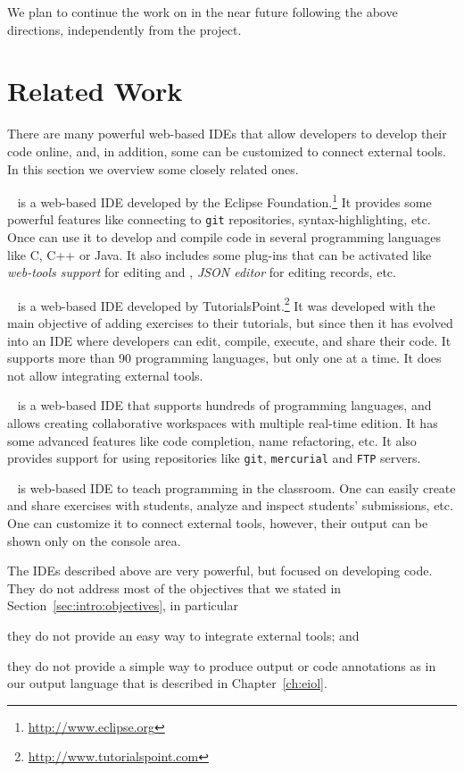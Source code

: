 \noindent
We plan to continue the work on \ei in the near future following the
above directions, independently from the \envisage project.

\section{Related Work}

There are many powerful web-based IDEs that allow developers to
develop their code online, and, in addition, some can be customized to
connect external tools. In this section we overview some closely
related ones.

~\cite{orion} is a web-based IDE developed by the Eclipse
Foundation.\footnote{\url{http://www.eclipse.org}}
%
It provides some powerful features like connecting to \texttt{git}
repositories, syntax-highlighting, etc. Once can use it to develop and
compile code in several programming languages like C, C++ or Java.
%
It also includes some plug-ins that can be activated like
\emph{web-tools support} for editing  and ,
\emph{JSON editor} for editing  records, etc.

~\cite{codingground} is a web-based IDE developed
by TutorialsPoint.\footnote{\url{http://www.tutorialspoint.com}}
%
It was developed with the main objective of adding exercises to their
tutorials, but since then it has evolved into an IDE where developers
can edit, compile, execute, and share their code.
%
It supports more than 90 programming languages, but only one at a
time. It does not allow integrating external tools.

~\cite{cloud9} is a web-based IDE that supports hundreds
of programming languages, and allows creating collaborative workspaces
with multiple real-time edition.
%
It has some advanced features like code completion, name refactoring,
etc. It also provides support for using repositories like
\texttt{git}, \texttt{mercurial} and \texttt{FTP} servers.
%

%
~\cite{codeboard} is web-based IDE to teach programming
in the classroom. One can easily create and share exercises with
students, analyze and inspect students' submissions, etc. One can
customize it to connect external tools, however, their output can be
shown only on the console area.


The IDEs described above are very powerful, but focused on developing
code. They do not address most of the objectives that we stated in
Section~\ref{sec:intro:objectives}, in particular
%
\begin{inparaenum}
\item they do not provide an easy way to integrate external tools; and
\item they do not provide a simple way to produce output or code
  annotations as in our output language that is described in
  Chapter~\ref{ch:eiol}.
\end{inparaenum}

